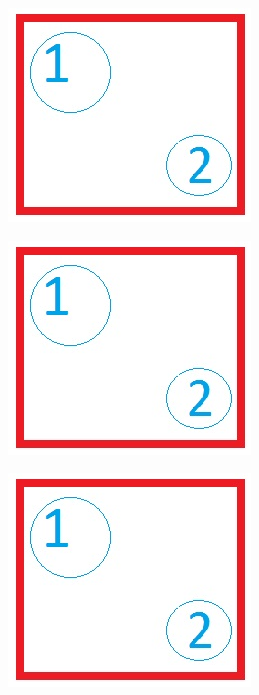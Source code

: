 \documentclass{article}
\begin{document}
\includegraphics[bb=13pt 65pt 63pt 115pt,clip]{clip-1-2.jpg}

\includegraphics[bb=13pt 65pt 63pt 115pt,clip]{clip-1-2.png}

\includegraphics[interpolate = true]{clip-1-2.jpg}

\clearpage

\END
\end{document}
